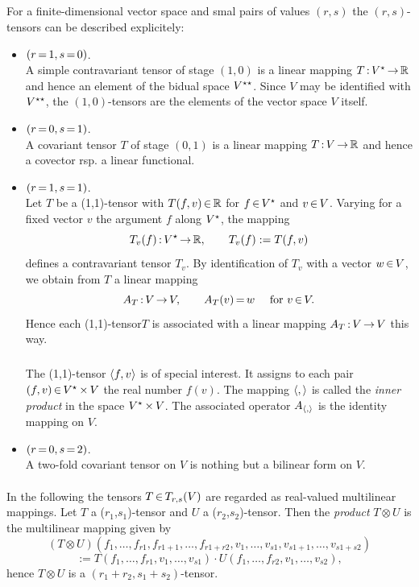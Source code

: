 \documentclass[11pt,twoside]{article}
\begin{document}
\subparagraph{}
For a finite-dimensional vector space and smal pairs of values $(r,s)$
the $(r,s)$-tensors can be described explicitely:

\begin{itemize}[leftmargin=15pt]
\item[1.]
$(r {\,=\,} 1, s {\,=\,} 0)$.\\
A simple contravariant tensor of stage $(1,0)$
is a linear mapping $T {\,:\,} V^\star {\,\to\,} {\mathbb{R}}$
and hence an element of the bidual space $V^{\star\star}$. 
Since $V$ may be identified with $V^{\star\star}$, 
the $(1,0)$-tensors are the elements of the vector space $V$ itself.

\item[2.]
$(r {\,=\,} 0, s {\,=\,} 1)$.\\
A covariant tensor $T$ of stage $(0,1)$ is a linear mapping $T{\,:\,}V {\,\to\,} {\mathbb{R}}$
and hence a covector rsp. a linear functional.

\item[3.]
$(r {\,=\,} 1, s {\,=\,} 1)$.\\
Let $T$ be a (1,1)-tensor with $T(f,v) {\,\in\,} {\mathbb{R}}$ for $f {\,\in\,} V^\star$
and $v {\,\in\,} V$. 
Varying for a fixed vector $v$ the argument $f$ 
along $V^\star$, the mapping
\[
T_v(f) {\,:\,} V^\star {\,\to\,} {\mathbb{R}}, \qquad T_v(f) := T(f,v)
\]
defines a contravariant tensor $T_v$. 
By identification of $T_v$ with a vector $w {\,\in\,} V$, 
we obtain from $T$ a linear mapping
\[
A_T {\,:\,} V {\,\to\,} V, \qquad A_T(v) {\,=\,} w \quad \mbox{ for } v {\,\in\,} V.
\]
Hence each (1,1)-tensor$T$ is associated with a linear mapping
$A_T {\,:\,} V {\,\to\,} V$ this way.

\subparagraph{}
The (1,1)-tensor $\left<f,v\right>$ is of special interest.
It assigns to each pair $(f,v) {\,\in\,} V^\star {\,\times\,} V$ the real number $f(v)$.
The mapping $\left<,\right>$ is called the \textit{inner product}
in the space $V^\star {\,\times\,} V$.
The associated operator $A_{\left<,\right>}$ is the identity mapping on $V$.

\item[4.]
$(r {\,=\,} 0, s {\,=\,} 2)$.\\
A two-fold covariant tensor on $V$ is nothing but a bilinear form on $V$. 
\end{itemize}

\paragraph{}
In the following the tensors $T {\,\in\,} T_{r,s}(V)$ are regarded as real-valued
multilinear mappings.
Let $T$ a ($r_1$,$s_1$)-tensor and $U$ a ($r_2$,$s_2$)-tensor. 
Then the \textit{product} $T \otimes U$ is the multilinear mapping given by
\[
(T \otimes U)(
   f_1,\ldots,f_{r1},f_{r1+1},\ldots,f_{r1+r2},
   v_1,\ldots,v_{s1},v_{s1+1},\ldots,v_{s1+s2})
\]
\[
  :=
  T(f_1,\ldots,f_{r1},v_1,\ldots,v_{s1}) 
\cdot
  U(f_1,\ldots,f_{r2},v_1,\ldots,v_{s2}),
\]
hence $T \otimes U$ is a $(r_1+r_2,s_1+s_2)$-tensor.
\end{document}
